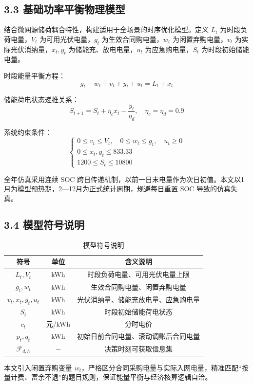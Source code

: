 \subsection{3.3 基础功率平衡物理模型}
结合微网源储荷耦合特性，构建适用于全场景的时序优化模型。定义 $L_t$ 为时段负荷电量，$V_t$ 为可用光伏电量，$g_t$ 为生效合同购电量，$w_t$ 为闲置弃购电量，$v_t$ 为实际光伏消纳量，$x_t,y_t$ 为储能充、放电电量，$u_t$ 为应急购电量，$S_t$ 为时段初始储能电量。

时段能量平衡方程：
\[
g_t - w_t + v_t + y_t + u_t = L_t + x_t
\]

储能荷电状态递推关系：
\[
S_{t+1}=S_t+\eta_c x_t-\dfrac{y_t}{\eta_d},\quad \eta_c=\eta_d=0.9
\]

系统约束条件：
\[
\begin{cases}
0\le v_t \le V_t,\quad 0\le w_t \le g_t,\quad u_t \ge 0\\
0\le x_t,y_t \le 833.33\\
1200 \le S_t \le 10800
\end{cases}
\]

全年仿真采用连续 SOC 跨日传递机制，以前一日末电量作为次日初值。本文以1月为模型预热期，2—12月为正式统计周期，规避每日重置 SOC 导致的仿真失真。

\subsection{3.4 模型符号说明}
\begin{table}[htbp]
\centering
\caption{模型符号说明}
\begin{tabular}{ccc}
\hline
符号 & 单位 & 含义说明 \\
\hline
$L_t,V_t$ & kWh & 时段负荷电量、可用光伏电量上限 \\
$g_t,w_t$ & kWh & 生效合同购电量、闲置弃购电量 \\
$v_t,x_t,y_t,u_t$ & kWh & 光伏消纳量、储能充放电量、应急购电量 \\
$S_t$ & kWh & 时段初始储能荷电状态 \\
$c_t$ & 元/kWh & 分时电价 \\
$p_t,q_t$ & kWh & 初始日前合同电量、滚动调账后合同电量 \\
$\mathcal{F}_{d,h}$ & $-$ & 决策时刻可获取信息集 \\
\hline
\end{tabular}
\label{tab:symbol}
\end{table}

本文引入闲置弃购变量 $w_t$，严格区分合同采购电量与实际入网电量，精准匹配“按量计费、富余不退”的题目规则，保证能量平衡与经济核算逻辑自洽。